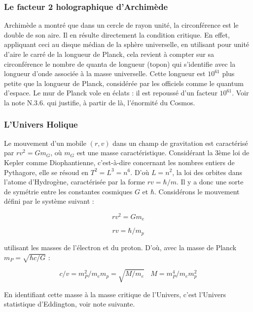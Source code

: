 \documentclass[a4paper,12pt]{article}
\begin{document}
\subsubsection{Le facteur 2 holographique d'Archimède}

Archimède a montré que dans un cercle de rayon unité, la circonférence est le double de son aire. Il en résulte directement la condition critique. En effet, appliquant ceci au disque médian de la sphère universelle, en utilisant pour unité d’aire le carré de la longueur de Planck, cela revient à compter sur sa circonférence le nombre de quanta de longueur (topon) qui s’identifie avec la longueur d’onde associée à la masse universelle. Cette longueur est $10^{61}$ plus petite que la longueur de Planck, considérée par les officiels comme le quantum d’espace. Le mur de Planck vole en éclats : il est repoussé d’un facteur $10^{61}$. Voir la note N.3.6. qui justifie, à partir de là, l’énormité du Cosmos. 



\subsubsection{L'Univers Holique}

 Le mouvement d'un mobile $(r,v)$ dans un champ de gravitation est caractérisé par $rv^2 = Gm_G$, où $m_G$ est une masse caractéristique. Considérant la 3ème loi de Kepler comme Diophantienne, c’est-à-dire concernant les nombres entiers de Pythagore, elle se résoud en $T^2 = L^3 = n^6$. D'où $L = n^2$, la loi des orbites dans l'atome d'Hydrogène, caractérisée par la forme $rv = \hbar/m$. Il y a donc une sorte de symétrie entre les constantes cosmiques $G$ et $\hbar$. Considérons le mouvement défini par le système suivant :
 
\begin{equation}
r v^2 = Gm_e
\end{equation}

\begin{equation}
r v = \hbar/m_p
\end{equation}

utilisant les masses de l'électron et du proton. D'où, avec la masse de Planck $m_P = \sqrt{\hbar c/G}$ :

\begin{equation}
c/v = m_P^2/m_em_p = \sqrt{M/m_e}                 ~~~~           M = m_P^4/m_em_p^2
\end{equation}

En identifiant cette masse à la masse critique de l'Univers, c'est  l'Univers statistique d'Eddington, voir note suivante.
\end{document}
